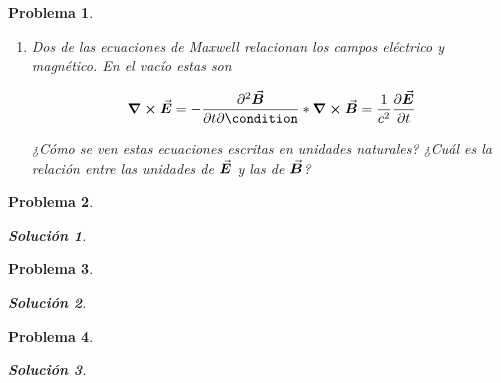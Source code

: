 \documentclass[12pt]{article}
\theoremstyle{break}
\newtheorem{exercise}{Problema}
\theoremstyle{nonumberbreak}
\newtheorem{solution}{Solución}
\begin{document}
\begin{exercise}
\begin{enumerate}[label = \alph*)]
            \item Dos de las ecuaciones de Maxwell relacionan los campos eléctrico y magnético. En el vacío estas son
            
            \begin{dmath}
                \curl{\va*{E}} = -\pdv{\va*{B}}{t} \condition*{\curl{\va*{B}} = \dfrac{1}{c^{2}} \displaystyle\pdv{\va*{E}}{t}}
            \end{dmath}

            ¿Cómo se ven estas ecuaciones escritas en unidades naturales? ¿Cuál es la relación entre las unidades de \(\va*{E}\) y las de \(\va*{B}\)?
        \end{enumerate}
    \end{exercise}

    \begin{exercise}
        \kant[1]
        \begin{solution}
            \kant[1]
        \end{solution}
    \end{exercise}

    \begin{exercise}
        \kant[1]
        \begin{solution}
            \kant[1-3]
        \end{solution}
    \end{exercise}

    \pagebreak
    \begin{exercise}
        \kant[1]
        \begin{solution}
            \kant[1-4]
        \end{solution}
    \end{exercise}
\end{document}
